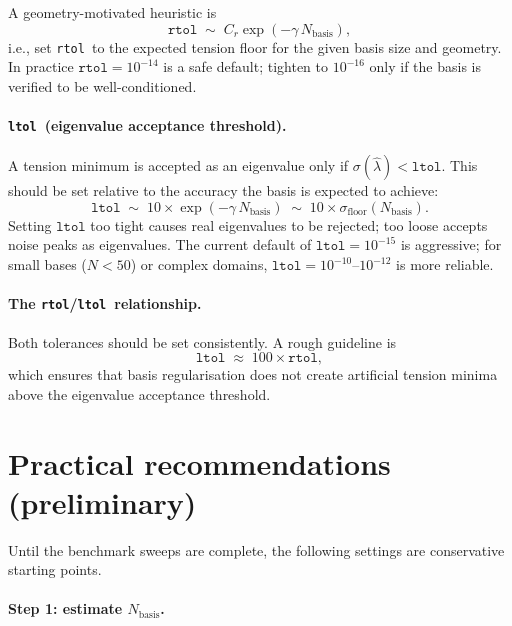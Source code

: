 \documentclass[11pt]{article}
\newcommand{\Nbasis}{N_{\mathrm{basis}}}
\newcommand{\ltol}{\texttt{ltol}}
\newcommand{\rtol}{\texttt{rtol}}
\begin{document}
A geometry-motivated heuristic is
\begin{equation}
  \rtol \;\sim\; C_r\exp(-\gamma\,\Nbasis),
\end{equation}
i.e., set \rtol\ to the expected tension floor for the given basis size and
geometry.  In practice $\rtol=10^{-14}$ is a safe default; tighten to
$10^{-16}$ only if the basis is verified to be well-conditioned.

\paragraph{\ltol\ (eigenvalue acceptance threshold).}
A tension minimum is accepted as an eigenvalue only if $\sigma(\hat\lambda)<\ltol$.
This should be set relative to the accuracy the basis is expected to achieve:
\begin{equation}
  \ltol \;\sim\; 10\times\exp(-\gamma\,\Nbasis) \;\sim\; 10\times\sigma_{\mathrm{floor}}(\Nbasis).
\end{equation}
Setting $\ltol$ too tight causes real eigenvalues to be rejected; too loose
accepts noise peaks as eigenvalues.  The current default of $\ltol=10^{-15}$ is
aggressive; for small bases ($N<50$) or complex domains,
$\ltol=10^{-10}$--$10^{-12}$ is more reliable.

\paragraph{The \rtol/\ltol\ relationship.}
Both tolerances should be set consistently.  A rough guideline is
\begin{equation}
  \ltol \;\approx\; 100\times\rtol,
\end{equation}
which ensures that basis regularisation does not create artificial tension minima
above the eigenvalue acceptance threshold.

\section{Practical recommendations (preliminary)}

Until the benchmark sweeps are complete, the following settings are conservative
starting points.

\paragraph{Step 1: estimate $\Nbasis$.}
\end{document}
